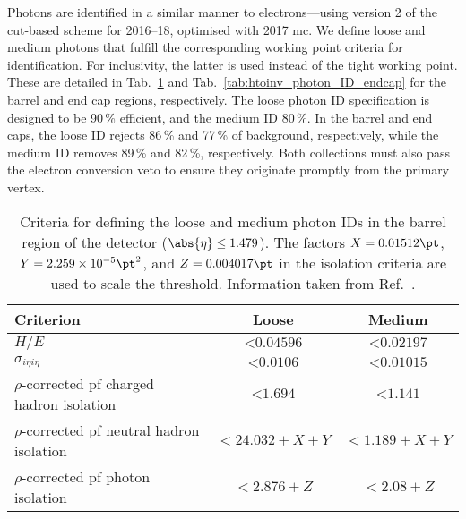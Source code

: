 Photons are identified in a similar manner to electrons---using version 2 of the cut-based scheme for 2016--18, optimised with 2017 \acrlong{mc}. We define loose \loosePhoton and medium photons \mediumPhoton that fulfill the corresponding working point criteria for identification. For inclusivity, the latter is used instead of the tight working point. These are detailed in Tab.~\ref{tab:htoinv_photon_ID_barrel} and Tab.~\ref{tab:htoinv_photon_ID_endcap} for the barrel and end cap regions, respectively. The loose photon ID specification is designed to be 90\,\% efficient, and the medium ID 80\,\%. In the barrel and end caps, the loose ID rejects 86\,\% and 77\,\% of background, respectively, while the medium ID removes 89\,\% and 82\,\%, respectively. Both collections must also pass the electron conversion veto to ensure they originate promptly from the primary vertex.

\begin{table}[htbp]
    \centering
    \begin{tabular}{lcc}
        \toprule
        Criterion & Loose & Medium \\\midrule
        $H/E$ & $< \text{0.04596}$ & $< \text{0.02197}$ \\
        $\sigma_{i\eta i\eta}$ & $< \text{0.0106}$ & $< \text{0.01015}$ \\
        $\rho$-corrected \acrshort{pf} charged hadron isolation & $< \text{1.694}$ & $< \text{1.141}$ \\
        $\rho$-corrected \acrshort{pf} neutral hadron isolation & $< \text{24.032} + X + Y$ & $< \text{1.189} + X + Y$ \\
        $\rho$-corrected \acrshort{pf} photon isolation & $< \text{2.876} + Z$ & $< \text{2.08} + Z$ \\
        \bottomrule
    \end{tabular}
    \caption[Criteria for defining the loose and medium photon IDs in the barrel region of the detector ($\abs{\eta} \leq \text{1.479}$)]{Criteria for defining the loose and medium photon IDs in the barrel region of the detector ($\abs{\eta} \leq \text{1.479}$). The factors $X = \text{0.01512}\pt$, $Y = \text{2.259} \times \text{10}^{-5}\pt^2$, and $Z = \text{0.004017}\pt$ in the isolation criteria are used to scale the threshold. Information taken from Ref.~.}
    \label{tab:htoinv_photon_ID_barrel}
\end{table}

